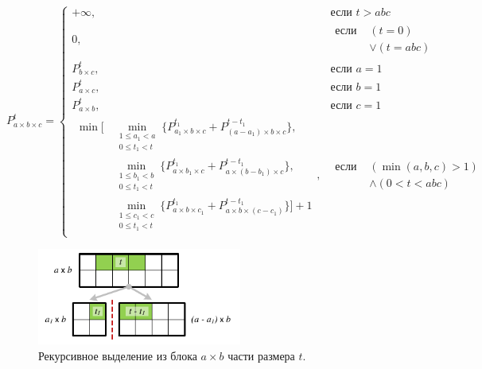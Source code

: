 \begin{equation}\label{eqn:par_pnmkt_3d}
P_{a \times b \times c}^t =
	\begin{cases}
		+\infty, & \text{если } t > abc \\
		0, & 
			\begin{aligned}
				\text{если } & (t = 0) \\[-10pt]
				& \vee (t = abc)
			\end{aligned} \\
		P_{b \times c}^t, & \text{если } a = 1 \\
		P_{a \times c}^t, & \text{если } b = 1 \\
		P_{a \times b}^t, & \text{если } c = 1 \\
		\begin{aligned}
			\min\big[
				& \min_{\substack{1 \le a_1 < a \\ 0 \le t_1 < t}}{\{P_{a_1 \times b \times c}^{t_1} + P_{(a - a_1) \times b \times c}^{t - t_1}\}}, \\[-8pt]
				& \min_{\substack{1 \le b_1 < b \\ 0 \le t_1 < t}}{\{P_{a \times b_1 \times c}^{t_1} + P_{a \times (b - b_1) \times c}^{t - t_1}\}}, \\[-8pt]
				& \min_{\substack{1 \le c_1 < c \\ 0 \le t_1 < t}}{\{P_{a \times b \times c_1}^{t_1} + P_{a \times b \times (c - c_1)}^{t - t_1}\}}
			\big] + 1
		\end{aligned}, & 
			\begin{aligned}
				\text{если } & (\min(a, b, c) > 1) \\[-10pt]
				& \wedge (0 < t < abc)
			\end{aligned}
	\end{cases}
\end{equation}

\begin{figure}[ht]
\centering
\includegraphics[width=0.6\textwidth]{fig/par_pnmt_2d.pdf}
\singlespacing
{}\caption{Рекурсивное выделение из блока $a \times b$ части размера $t$.}
\label{fig:par_pnmt_2d}
\end{figure}

